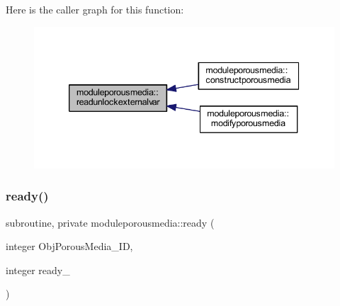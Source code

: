 Here is the caller graph for this function\+:\nopagebreak
\begin{figure}[H]
\begin{center}
\leavevmode
\includegraphics[width=339pt]{namespacemoduleporousmedia_ade70c21b16e6288bf0e789900f845c5a_icgraph}
\end{center}
\end{figure}
\mbox{\label{namespacemoduleporousmedia_a9773f71db5ddd0e9b7ddeac94fc33e39}} 
\subsubsection{\texorpdfstring{ready()}{ready()}}
{\footnotesize\ttfamily subroutine, private moduleporousmedia\+::ready (\begin{DoxyParamCaption}\item[{integer}]{Obj\+Porous\+Media\+\_\+\+ID,  }\item[{integer}]{ready\+\_\+ }\end{DoxyParamCaption})\hspace{0.3cm}{\ttfamily [private]}}

